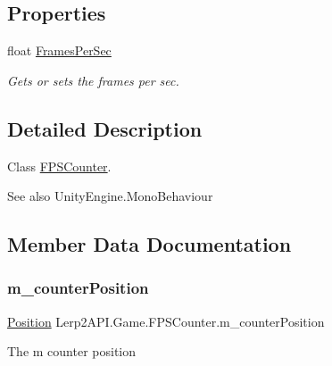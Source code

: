 \subsection*{Properties}
\begin{DoxyCompactItemize}
\item 
float \hyperlink{class_lerp2_a_p_i_1_1_game_1_1_f_p_s_counter_ac04fcbbbae098f3edcf98aa3ab035406}{Frames\+Per\+Sec}
\begin{DoxyCompactList}\small\item\em Gets or sets the frames per sec. \end{DoxyCompactList}\end{DoxyCompactItemize}


\subsection{Detailed Description}
Class \hyperlink{class_lerp2_a_p_i_1_1_game_1_1_f_p_s_counter}{F\+P\+S\+Counter}. 

\begin{DoxySeeAlso}{See also}
Unity\+Engine.\+Mono\+Behaviour


\end{DoxySeeAlso}


\subsection{Member Data Documentation}
\mbox{\label{class_lerp2_a_p_i_1_1_game_1_1_f_p_s_counter_a025577891ecddb9022e29fd461b5abec}} 
\subsubsection{\texorpdfstring{m\+\_\+counter\+Position}{m\_counterPosition}}
{\footnotesize\ttfamily \hyperlink{namespace_lerp2_a_p_i_a5b0f263f740f1f4c8b67cf0c011dd90d}{Position} Lerp2\+A\+P\+I.\+Game.\+F\+P\+S\+Counter.\+m\+\_\+counter\+Position}



The m counter position 

